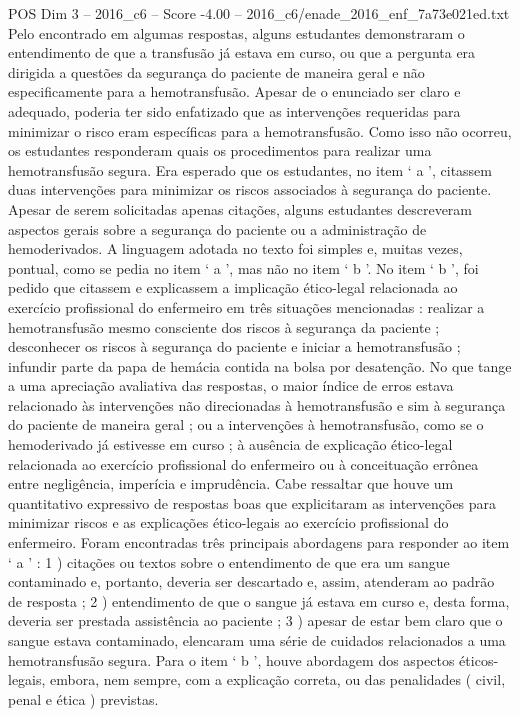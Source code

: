 \begin{textsample}{POS Dim 3 – 2016\_c6 – Score -4.00 – 2016\_c6/enade\_2016\_enf\_7a73e021ed.txt}
Pelo encontrado em algumas respostas, alguns estudantes demonstraram o entendimento de que a transfusão já estava em curso, ou que a pergunta era dirigida a questões da segurança do paciente de maneira geral e não especificamente para a hemotransfusão.
Apesar de o enunciado ser claro e adequado, poderia ter sido enfatizado que as intervenções requeridas para minimizar o risco eram específicas para a hemotransfusão.
Como isso não ocorreu, os estudantes responderam quais os procedimentos para realizar uma hemotransfusão segura.
Era esperado que os estudantes, no item ‘ a ’, citassem duas intervenções para minimizar os riscos associados à segurança do paciente.
Apesar de serem solicitadas apenas citações, alguns estudantes descreveram aspectos gerais sobre a segurança do paciente ou a administração de hemoderivados.
A linguagem adotada no texto foi simples e, muitas vezes, pontual, como se pedia no item ‘ a ’, mas não no item ‘ b ’.
No item ‘ b ’, foi pedido que citassem e explicassem a implicação ético-legal relacionada ao exercício profissional do enfermeiro em três situações mencionadas : realizar a hemotransfusão mesmo consciente dos riscos à segurança da paciente ; desconhecer os riscos à segurança do paciente e iniciar a hemotransfusão ; infundir parte da papa de hemácia contida na bolsa por desatenção.
No que tange a uma apreciação avaliativa das respostas, o maior índice de erros estava relacionado às intervenções não direcionadas à hemotransfusão e sim à segurança do paciente de maneira geral ; ou a intervenções à hemotransfusão, como se o hemoderivado já estivesse em curso ; à ausência de explicação ético-legal relacionada ao exercício profissional do enfermeiro ou à conceituação errônea entre negligência, imperícia e imprudência.
Cabe ressaltar que houve um quantitativo expressivo de respostas boas que explicitaram as intervenções para minimizar riscos e as explicações ético-legais ao exercício profissional do enfermeiro.
Foram encontradas três principais abordagens para responder ao item ‘ a ’ : 1 ) citações ou textos sobre o entendimento de que era um sangue contaminado e, portanto, deveria ser descartado e, assim, atenderam ao padrão de resposta ; 2 ) entendimento de que o sangue já estava em curso e, desta forma, deveria ser prestada assistência ao paciente ; 3 ) apesar de estar bem claro que o sangue estava contaminado, elencaram uma série de cuidados relacionados a uma hemotransfusão segura.
Para o item ‘ b ’, houve abordagem dos aspectos éticos-legais, embora, nem sempre, com a explicação correta, ou das penalidades ( civil, penal e ética ) previstas.

\end{textsample}
